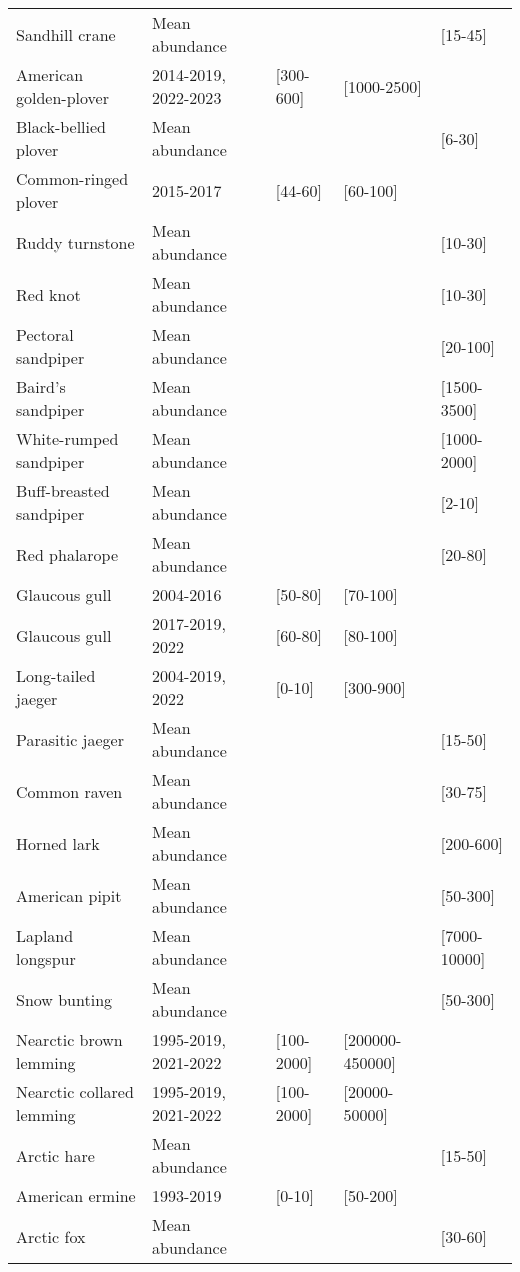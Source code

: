 \begin{table}[ht]
\begin{tabularx}{\textwidth}{lllll}
  Sandhill crane & Mean abundance &  &  & [15-45] \\ 
  American golden-plover & 2014-2019, 2022-2023 & [300-600] & [1000-2500] &  \\ 
  Black-bellied plover & Mean abundance &  &  & [6-30] \\ 
  Common-ringed plover & 2015-2017 & [44-60] & [60-100] &  \\ 
  Ruddy turnstone & Mean abundance &  &  & [10-30] \\ 
  Red knot & Mean abundance &  &  & [10-30] \\ 
  Pectoral sandpiper & Mean abundance &  &  & [20-100] \\ 
  Baird's sandpiper & Mean abundance &  &  & [1500-3500] \\ 
  White-rumped sandpiper & Mean abundance &  &  & [1000-2000] \\ 
  Buff-breasted sandpiper & Mean abundance &  &  & [2-10] \\ 
  Red phalarope & Mean abundance &  &  & [20-80] \\ 
  Glaucous gull & 2004-2016 & [50-80] & [70-100] &  \\ 
  Glaucous gull & 2017-2019, 2022 & [60-80] & [80-100] &  \\ 
  Long-tailed jaeger & 2004-2019, 2022 & [0-10] & [300-900] &  \\ 
  Parasitic jaeger & Mean abundance &  &  & [15-50] \\ 
  Common raven & Mean abundance &  &  & [30-75] \\ 
  Horned lark & Mean abundance &  &  & [200-600] \\ 
  American pipit & Mean abundance &  &  & [50-300] \\ 
  Lapland longspur & Mean abundance &  &  & [7000-10000] \\ 
  Snow bunting & Mean abundance &  &  & [50-300] \\ 
  Nearctic brown lemming & 1995-2019, 2021-2022 & [100-2000] & [200000-450000] &  \\ 
  Nearctic collared lemming & 1995-2019, 2021-2022 & [100-2000] & [20000-50000] &  \\ 
  Arctic hare & Mean abundance &  &  & [15-50] \\ 
  American ermine & 1993-2019 & [0-10] & [50-200] &  \\ 
  Arctic fox & Mean abundance &  &  & [30-60] \\ 
   \hline
\end{tabularx}
\endgroup
\end{table}
